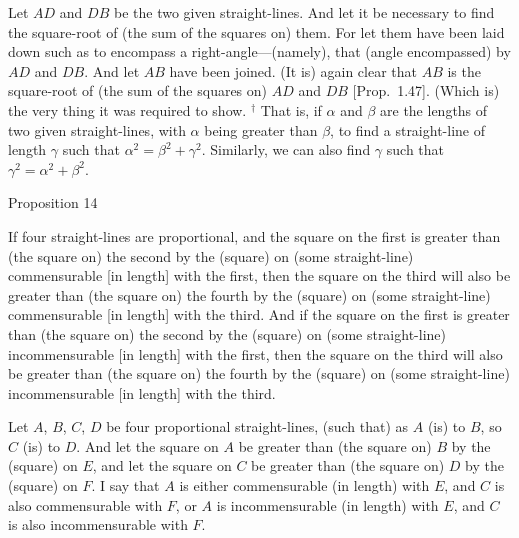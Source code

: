 Let $AD$ and $DB$ be the two given straight-lines. And let it
be necessary to find the square-root of (the sum of the squares on) them. For let
them have been laid down such as to encompass a right-angle---(namely), that (angle encompassed) by
$AD$ and $DB$. And let $AB$ have been joined. (It is) again clear that $AB$ is the square-root of   (the sum of the squares on) $AD$ and $DB$ [Prop.~1.47]. (Which is) the very thing it was required to show.
{\footnotesize\noindent$^\dag$ That is, if $\alpha$ and $\beta$ are the lengths of two given straight-lines, with $\alpha$ being greater
than $\beta$, to find a straight-line of length $\gamma$ such that $\alpha^2=\beta^2+\gamma^2$. Similarly, we can also find $\gamma$
such that $\gamma^2=\alpha^2+\beta^2$.}


\begin{center}
{\large Proposition 14}
\end{center}

If four straight-lines are proportional, and the
square on the first is greater  than (the square on) the second  by the (square) on (some straight-line) commensurable [in length] with the first, then the
square on the  third will also
be greater  than (the square on) the fourth by the (square) on (some straight-line) commensurable [in length]
with the third. And if the
square on the first is greater  than (the  square on) the second  by the (square) on (some straight-line) incommensurable [in length] with the first, then the square on the third will also
be greater than (the  square on) the fourth by the (square) on (some straight-line) incommensurable [in length]
with the third. 

Let $A$, $B$, $C$, $D$ be four proportional straight-lines, (such that)
as $A$ (is) to $B$, so $C$ (is) to $D$. And let the square on $A$ be greater 
than (the square on) $B$ by the (square) on $E$, and let the square on $C$ be greater
than (the square on) $D$ by the (square) on $F$. I say that 
$A$ is either commensurable (in length) with $E$, and $C$ is also commensurable with $F$, or $A$ is incommensurable (in length) with $E$, and $C$ is also incommensurable with $F$.

\centerline{}

